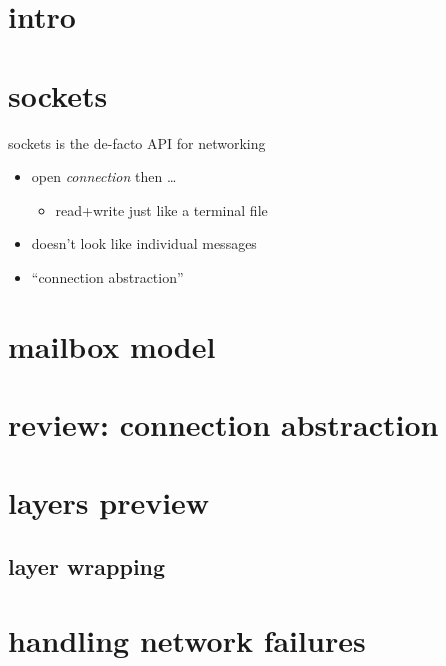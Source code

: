 


\section{intro}


\section{sockets}

\begin{frame}{sockets is the de-facto API for networking}
    \begin{itemize}
    \item open \textit{connection} then \ldots
        \begin{itemize}
        \item read+write just like a terminal file
        \end{itemize}
    \vspace{.5cm}
    \item doesn't look like individual messages
    \item ``connection abstraction''
    \end{itemize}
\end{frame}

\section{mailbox model}


\section{review: connection abstraction}



\section{layers preview}


\subsection{layer wrapping}


\section{handling network failures}


